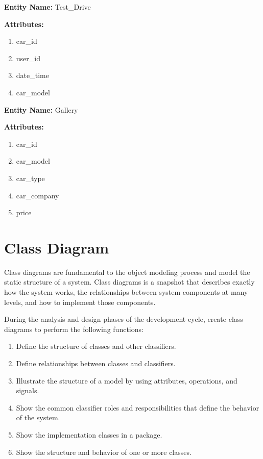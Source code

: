 \noindent

\noindent \textbf{Entity Name: } Test\_Drive

\noindent \textbf{Attributes:}

\begin{enumerate}
\item car\_id

\item  user\_id

\item  date\_time

\item  car\_model

\end{enumerate}

\noindent

\noindent \textbf{Entity Name: } Gallery

\noindent \textbf{Attributes:}

\begin{enumerate}
\item car\_id

\item  car\_model

\item  car\_type

\item  car\_company

\item  price
\end{enumerate}




\noindent 

\noindent 



 
\section{ Class Diagram}

\noindent Class diagrams are fundamental to the object modeling process and model the static structure of a system. Class diagrams is a snapshot that describes exactly how the system works, the relationships between system components at many levels, and how to implement those components.

\noindent During the analysis and design phases of the development cycle, create class diagrams to perform the following functions:

\begin{enumerate}
\item  Define the structure of classes and other classifiers.
\item  Define relationships between classes and classifiers.
\item  Illustrate the structure of a model by using attributes, operations, and signals.
\item  Show the common classifier roles and responsibilities that define the behavior of the system.
\item  Show the implementation classes in a package.
\item  Show the structure and behavior of one or more classes.
\end{enumerate}

